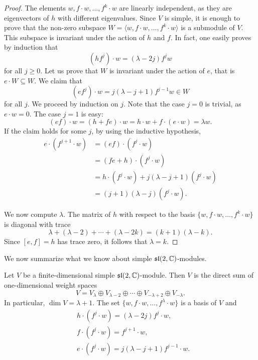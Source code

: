 \begin{proof}
    The elements $w,f\cdot w,\dots,f^{k}\cdot w$ 
    are linearly independent, as they are eigenvectors of $h$ with 
    different eigenvalues. Since $V$ is simple, it is enough 
    to prove that 
    the non-zero subspace $W=\langle w,f\cdot w,\dots,f^k\cdot w\rangle$ 
    is a submodule of $V$. This subspace 
    is invariant under the action of 
    $h$ and $f$. In fact, one easily proves by induction that 
    \[
    (hf^j)\cdot w=(\lambda-2j)f^jw
    \]
    for all $j\geq0$. 
    Let us prove that $W$ is invariant 
    under the action of $e$, that is $e\cdot W\subseteq W$. 
    We claim that 
    \[
    (ef^{j})\cdot w=j(\lambda-j+1)f^{j-1}w\in W
    \]
    for all $j$. We proceed by induction on $j$. Note that 
    the case $j=0$ is trivial, as $e\cdot w=0$. 
    The case $j=1$ is easy:
    \[
    (ef)\cdot w=(h+fe)\cdot w=h\cdot w+f\cdot (e\cdot w)=\lambda w.
    \]
    If the claim holds for some $j$, by using 
    the inductive hypothesis, 
    \begin{align*}
        e\cdot(f^{j+1}\cdot w)&=(ef)\cdot (f^{j}\cdot w)\\
        &=(fe+h)\cdot (f^{j}\cdot w)\\
        &=h\cdot (f^j\cdot w)+j(\lambda-j+1)(f^j\cdot w)\\
        &=(j+1)(\lambda-j)(f^{j}\cdot w).
    \end{align*}
    
    We now compute $\lambda$. 
    The matrix of $h$ with respect to the basis 
    $\{w,f\cdot w,\dots,f^k\cdot w\}$ 
    is diagonal with trace 
    \[
    \lambda+(\lambda-2)+\cdots+(\lambda-2k)=(k+1)(\lambda-k).
    \]
    Since $[e,f]=h$ has trace zero, it follows that $\lambda=k$. 
\end{proof}

We now summarize what we know about 
simple $\mathfrak{sl}(2,\mathbb{C})$-modules.

\begin{theorem}
    Let $V$ be a finite-dimensional simple $\mathfrak{sl}(2,\mathbb{C})$-module.
    Then 
    $V$ is the direct sum of one-dimensional weight spaces
    \begin{equation}
    \label{eq:sl2_decomposition}
        V=V_{\lambda}\oplus V_{\lambda-2}\oplus\cdots\oplus V_{-\lambda+2}\oplus V_{-\lambda}.
    \end{equation}
    In particular, $\dim V=\lambda+1$. 
    The set $\{w,f\cdot w,\dots,f^\lambda\cdot w\}$ 
    is a basis of $V$ and 
    \begin{equation}
        \label{eq:sl2_module}
        \begin{aligned}
            &h\cdot (f^j\cdot w)=(\lambda-2j)f^j\cdot w,\\
            &f\cdot (f^j\cdot w)=f^{j+1}\cdot w,\\
            &e\cdot (f^j\cdot w)=j(\lambda-j+1)f^{j-1}\cdot w.
        \end{aligned}
    \end{equation}
\end{theorem}

